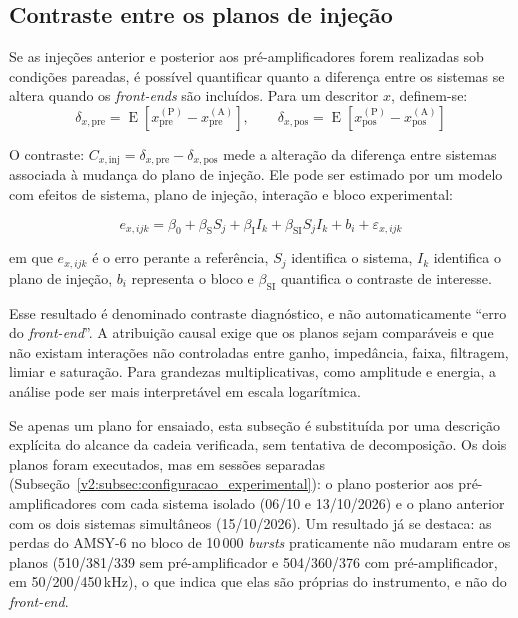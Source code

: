 \subsection{Contraste entre os planos de injeção}
\label{v2:subsec:decomposicao_divergencias_resultados}

Se as injeções anterior e posterior aos pré-amplificadores forem realizadas sob condições pareadas, é possível quantificar quanto a diferença entre os sistemas se altera quando os \textit{front-ends} são incluídos. Para um descritor \(x\), definem-se:
\begin{equation}
	\delta_{x,\mathrm{pre}} = \operatorname{E} \left[x^{(\mathrm{P})}_{\mathrm{pre}} - x^{(\mathrm{A})}_{\mathrm{pre}}\right], \qquad \delta_{x,\mathrm{pos}} = \operatorname{E} \left[x^{(\mathrm{P})}_{\mathrm{pos}} - x^{(\mathrm{A})}_{\mathrm{pos}}\right]	\label{v2:eq:diferencas_planos_injecao}
\end{equation}

O contraste: \(C_{x,\mathrm{inj}} = \delta_{x,\mathrm{pre}} - \delta_{x,\mathrm{pos}}\) mede a alteração da diferença entre sistemas associada à mudança do plano de injeção. Ele pode ser estimado por um modelo com efeitos de sistema, plano de injeção, interação e bloco experimental:

\begin{equation}
	e_{x,ijk} = \beta_0 + \beta_{\mathrm{S}}S_j + \beta_{\mathrm{I}}I_k + \beta_{\mathrm{SI}}S_jI_k + b_i + \varepsilon_{x,ijk}
	\label{v2:eq:modelo_contraste_injecao}
\end{equation}

\noindent
em que \(e_{x,ijk}\) é o erro perante a referência, \(S_j\) identifica o sistema, \(I_k\) identifica o plano de injeção, \(b_i\) representa o bloco e \(\beta_{\mathrm{SI}}\) quantifica o contraste de interesse. 

Esse resultado é denominado contraste diagnóstico, e não automaticamente ``erro do \textit{front-end}''. A atribuição causal exige que os planos sejam comparáveis e que não existam interações não controladas entre ganho, impedância, faixa, filtragem, limiar e saturação. Para grandezas multiplicativas, como amplitude e energia, a análise pode ser mais interpretável em escala logarítmica.

Se apenas um plano for ensaiado, esta subseção é substituída por uma descrição explícita do alcance da cadeia verificada, sem tentativa de decomposição. 
Os dois planos foram executados, mas em sessões separadas (Subseção~\ref{v2:subsec:configuracao_experimental}): o plano posterior aos pré-amplificadores com cada sistema isolado (06/10 e 13/10/2026) e o plano anterior com os dois sistemas simultâneos (15/10/2026). Um resultado já se destaca: as perdas do AMSY-6 no bloco de 10\,000 \textit{bursts} praticamente não mudaram entre os planos (510/381/339 sem pré-amplificador e 504/360/376 com pré-amplificador, em 50/200/450\,kHz), o que indica que elas são próprias do instrumento, e não do \textit{front-end}.


